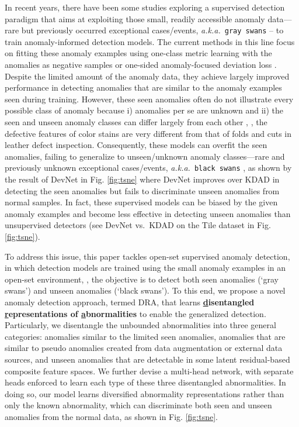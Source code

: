 \documentclass[10pt,twocolumn,letterpaper]{article}
\begin{document}
In recent years, there have been some studies \cite{ruff2019deep,pang2019deep,pang2021explainable,liu2019margin} exploring a supervised detection paradigm that  
aims at exploiting those small, readily accessible anomaly data---rare but previously occurred exceptional cases/events, \textit{a.k.a.}\ \texttt{gray swans} \cite{khakzad2015grayswan} -- to train anomaly-informed detection models. The current methods in this line focus on fitting these anomaly examples using one-class metric learning with the anomalies as negative samples \cite{ruff2019deep,liu2019margin} or one-sided anomaly-focused deviation loss \cite{pang2019deep,pang2021explainable}. Despite the limited amount of the anomaly data, they achieve largely improved performance in detecting anomalies that are similar to the anomaly examples seen during training. However, these seen anomalies often do not illustrate every possible class of anomaly because i) anomalies per se are unknown and ii) the seen and unseen anomaly classes can differ largely from each other \cite{pang2021deep}, \eg, the defective features of color stains are very different from that of folds and cuts in leather defect inspection. Consequently, these models can overfit the seen anomalies,
failing to generalize to unseen/unknown anomaly classes---rare and previously unknown exceptional cases/events, \textit{a.k.a.}\  \texttt{black swans} \cite{taleb2007black}, as shown by the result of DevNet \cite{pang2019deep,pang2021explainable} in Fig. \ref{fig:tsne} where DevNet improves over KDAD in detecting the seen anomalies but fails to discriminate unseen anomalies from normal samples. In fact, these supervised models can be biased by the given anomaly examples and become less effective in detecting unseen anomalies than unsupervised detectors (see DevNet vs.\  KDAD on the Tile dataset in Fig. \ref{fig:tsne}).


To address this issue, this paper tackles open-set supervised anomaly detection, in which detection models are trained using the small anomaly examples in an open-set environment, \ie, the objective is to detect both seen anomalies (`gray swans') and unseen anomalies (`black swans').
To this end, we propose a novel anomaly detection approach, termed DRA, that learns \textbf{\underline{d}isentangled \underline{r}epresentations of \underline{a}bnormalities} to enable the generalized detection.
Particularly, we disentangle the unbounded abnormalities into three general categories: anomalies similar to the limited seen anomalies, anomalies that are similar to pseudo anomalies created from data augmentation or external data sources, and unseen anomalies that are detectable in some latent residual-based composite feature spaces. We further devise a multi-head network, with separate heads enforced to learn each type of these three disentangled abnormalities. In doing so, our model learns diversified abnormality representations rather than only the known abnormality, which can discriminate both seen and unseen anomalies from the normal data, as shown in Fig. \ref{fig:tsne}.
\end{document}

